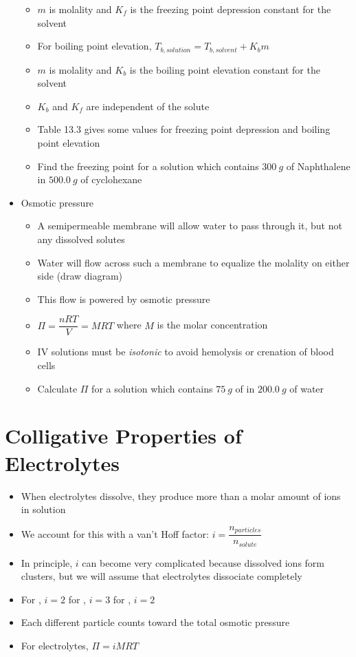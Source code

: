 \documentclass[12pt, openany, letterpaper]{memoir}
\begin{document}
\begin{itemize}
\begin{itemize}
		\item $m$ is molality and $K_f$ is the freezing point depression constant for the solvent
		\item For boiling point elevation, $T_{b,solution}=T_{b,solvent}+K_bm$
		\item $m$ is molality and $K_b$ is the boiling point elevation constant for the solvent
		\item $K_b$ and $K_f$ are independent of the solute
		\item Table 13.3 gives some values for freezing point depression and boiling point elevation
		\item Find the freezing point for a solution which contains $300~g$ of Naphthalene in $500.0~g$ of cyclohexane
	\end{itemize}
	\item Osmotic pressure
	\begin{itemize}
		\item A semipermeable membrane will allow water to pass through it, but not any dissolved solutes
		\item Water will flow across such a membrane to equalize the molality on either side (draw diagram)
		\item This flow is powered by osmotic pressure
		\item $\Pi = \dfrac{nRT}{V}=MRT$ where $M$ is the molar concentration
		\item IV solutions must be \emph{isotonic} to avoid hemolysis or crenation of blood cells
		\item Calculate $\Pi$ for a solution which contains $75~g$ of  in $200.0~g$ of water
	\end{itemize}
\end{itemize}
\section{Colligative Properties of Electrolytes}
\begin{itemize}
	\item When electrolytes dissolve, they produce more than a molar amount of ions in solution
	\item We account for this with a van't Hoff factor: $i=\dfrac{n_{particles}}{n_{solute}}$
	\item In principle, $i$ can become very complicated because dissolved ions form clusters, but we will assume that electrolytes dissociate completely
	\item For , $i=2$ \hspace{2em} for , $i=3$ \hspace{2em} for , $i=2$
	\item Each different particle counts toward the total osmotic pressure
	\item For electrolytes, $\Pi=iMRT$
\end{itemize}
\end{document}
